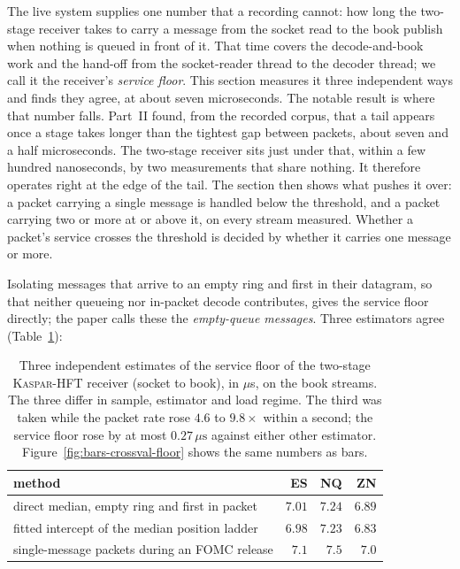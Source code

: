 \documentclass[11pt]{article}
\newcommand{\kasparhft}{\textsc{Kaspar-HFT}}
\begin{document}
The live system supplies one number that a recording cannot: how long the two-stage
receiver takes to carry a message from the socket read to the book publish when nothing is
queued in front of it. That time covers the decode-and-book work and the hand-off from the
socket-reader thread to the decoder thread; we call it the receiver's \emph{service floor}.
This section measures it three independent ways and finds they agree, at about seven
microseconds. The notable result is where that number falls. Part~II found, from the
recorded corpus, that a tail appears once a stage takes longer than the tightest gap
between packets, about seven and a half microseconds. The two-stage receiver sits just
under that, within a few hundred nanoseconds, by two measurements that share nothing.
It therefore operates right at the edge of the tail. The section then
shows what pushes it over: a packet carrying a single message is handled below the
threshold, and a packet carrying two or more at or above it, on every stream measured.
Whether a packet's service crosses the threshold is decided by whether it carries one
message or more.

Isolating messages that arrive to an empty ring and first in their datagram,
so that neither queueing nor in-packet decode contributes, gives the service floor
directly; the paper calls these the \emph{empty-queue messages}. Three estimators agree (Table~\ref{tab:crossval-floor}):

\begin{table}[H]
\centering
\small
\begin{tabular}{@{}lrrr@{}}
\toprule
method & ES & NQ & ZN \\
\midrule
direct median, empty ring and first in packet & $7.01$ & $7.24$ & $6.89$ \\
fitted intercept of the median position ladder & $6.98$ & $7.23$ & $6.83$ \\
single-message packets during an FOMC release & $7.1$ & $7.5$ & $7.0$ \\
\bottomrule
\end{tabular}
\caption{Three independent estimates of the service floor of the two-stage \kasparhft{} receiver (socket to book), in
$\mu$s, on the book streams. The three differ in sample, estimator and load regime. The
third was taken while the packet rate rose $4.6$ to $9.8\times$ within a second; the service floor
rose by at most $0.27\,\mu\mathrm{s}$ against either other estimator. Figure~\ref{fig:bars-crossval-floor} shows the same numbers as bars.}
\label{tab:crossval-floor}
\end{table}
\end{document}

